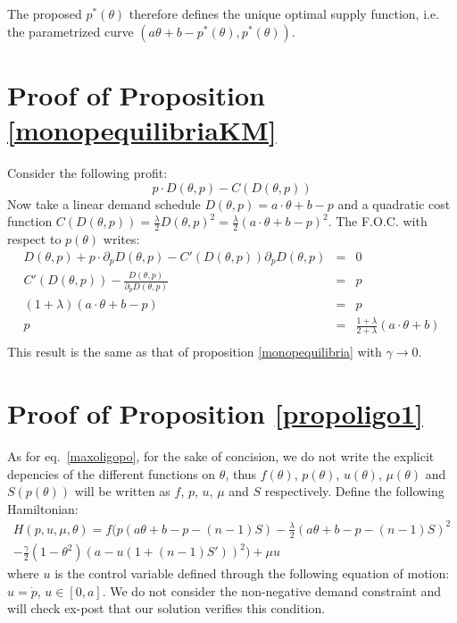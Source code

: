 \begin{subappendices}
The proposed $p^*(\theta)$ therefore defines the unique optimal supply function, i.e. the parametrized curve $(a \theta +b-p^*(\theta),p^*(\theta))$.

\section{Proof of Proposition \ref{monopequilibriaKM} \label{annexmonopKM}}
Consider the following profit:
$$p\cdot D(\theta,p) - C(D(\theta,p))$$
Now take a linear demand schedule $D(\theta,p) = a\cdot \theta + b - p$ and a quadratic cost function $C(D(\theta,p)) = \frac{\lambda}{2} D(\theta,p)^2 = \frac{\lambda}{2}(a\cdot \theta + b - p)^2$.
The F.O.C. with respect to $p(\theta)$ writes:
\begin{eqnarray}
D(\theta,p)  + p\cdot \partial_p D(\theta,p) - C'(D(\theta,p))\partial_p D(\theta,p)  &=&0\\
C'(D(\theta,p)) - \frac{D(\theta,p)}{\partial_p D(\theta,p)} & =&p\\
(1+\lambda)(a\cdot\theta+b-p)&=&p\\
p&=&\frac{1+\lambda}{2+\lambda}(a\cdot\theta+b)\\
\end{eqnarray}
This result is the same as that of proposition  \ref{monopequilibria} with $\gamma \to 0$.

\section{Proof of Proposition \ref{propoligo1} \label{annex1}}
As for eq.~\ref{maxoligopo}, for the sake of concision, we do not write the explicit depencies of the different functions on $\theta$, thus $f(\theta)$, $p(\theta)$, $u(\theta)$, $\mu(\theta)$ and $S(p(\theta))$ will be written as $f$, $p$, $u$, $\mu$ and $S$ respectively. Define the following Hamiltonian: 
\begin{equation}
\begin{split}
H(p,u,\mu,\theta)= f\bigg( p(a\theta+b-p-(n-1)S)-\frac{\lambda}{2}(a\theta+b-p-(n-1)S)^2\\
-\frac{\gamma}{2}(1-\theta^2)\left(a-u(1+(n-1)S')\right)^2\bigg)+\mu u
\end{split}
\end{equation}
where $u$ is the control variable defined through the following equation of motion: $u=\dot{p}$, $u\in[0,a]$. We do not consider the non-negative demand constraint and will check ex-post that our solution verifies this condition. \\


\end{subappendices}
